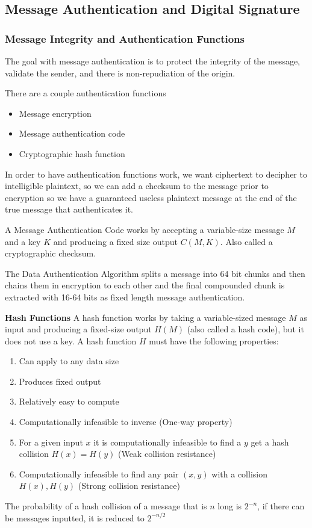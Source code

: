\documentclass[11pt]{article}
\begin{document}
\subsection{Message Authentication and Digital Signature}
\subsubsection{Message Integrity and Authentication Functions}
The goal with message authentication is to protect the integrity of the message, validate the sender, and there is non-repudiation of the origin.

There are a couple authentication functions
\begin{itemize}
    \item Message encryption
    \item Message authentication code
    \item Cryptographic hash function
\end{itemize}

In order to have authentication functions work, we want ciphertext to decipher to intelligible plaintext, so we can add a checksum to the message prior to encryption so we have a guaranteed useless plaintext message at the end of the true message that authenticates it.

A Message Authentication Code works by accepting a variable-size message $M$ and a key $K$ and producing a fixed size output $C(M,K)$.
Also called a cryptographic checksum.

The Data Authentication Algorithm splits a message into 64 bit chunks and then chains them in encryption to each other and the final compounded chunk is extracted with 16-64 bits as fixed length message authentication.

\textbf{Hash Functions}
A hash function works by taking a variable-sized message $M$ as input and producing a fixed-size output $H(M)$ (also called a hash code), but it does not use a key.
A hash function $H$ must have the following properties:
\begin{enumerate}
    \item Can apply to any data size
    \item Produces fixed output
    \item Relatively easy to compute
    \item Computationally infeasible to inverse (One-way property)
    \item For a given input $x$ it is computationally infeasible to find a $y$ get a hash collision $H(x) = H(y)$ (Weak collision resistance)
    \item Computationally infeasible to find any pair $(x,y)$ with a collision $H(x), H(y)$ (Strong collision resistance)
\end{enumerate}
The probability of a hash collision of a message that is $n$ long is $2^{-n}$, if there can be messages inputted, it is reduced to $2^{-n/2}$
\end{document}
